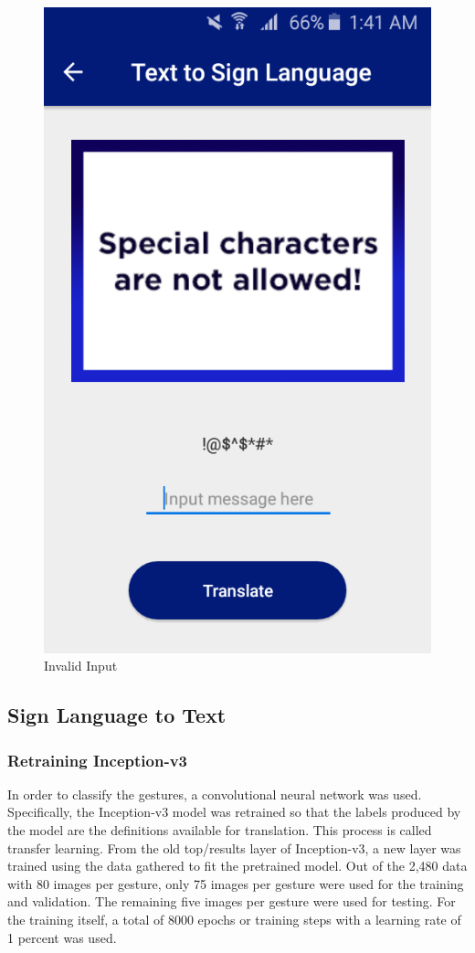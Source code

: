 \documentclass[journal]{./IEEE/IEEEtran}
\begin{document}
\begin{figure}[ht!]
    \centering
    \includegraphics[width=0.75\linewidth]{./images/screen_tts_error.png}
    \caption{Invalid Input}
    \label{fig:tts_error}
\end{figure}


\subsection{Sign Language to Text}
\subsubsection{Retraining Inception-v3}
In order to classify the gestures, a convolutional neural network was used. Specifically, the Inception-v3 model was retrained so that the labels produced by the model are the definitions available for translation.
\newline
\indent This process is called transfer learning. From the old top/results layer of Inception-v3, a new layer was trained using the data gathered to fit the pretrained model. Out of the 2,480 data with 80 images per gesture, only 75 images per gesture were used for the training and validation. The remaining five images per gesture were used for testing.
\newline
\indent For the training itself, a total of 8000 epochs or training steps with a learning rate of 1 percent was used.
\newline
\end{document}
